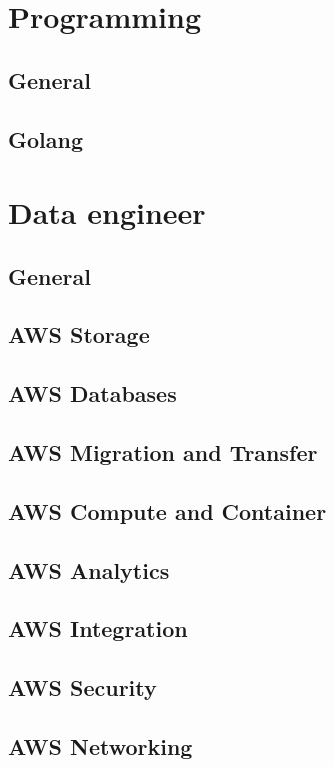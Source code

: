 \documentclass{book}
\begin{document}
\tableofcontents

\chapter{Programming}
\section{General}

\section{Golang}



\chapter{Data engineer}
\section{General}

\newpage
\section{AWS Storage}

\newpage
\section{AWS Databases}

\newpage
\section{AWS Migration and Transfer}

\newpage
\section{AWS Compute and Container}

\newpage
\section{AWS Analytics}

\newpage
\section{AWS Integration}

\newpage
\section{AWS Security}

\newpage
\section{AWS Networking}

\newpage
\end{document}
